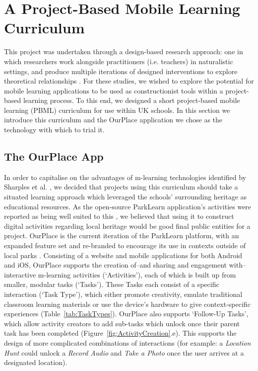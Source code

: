 \documentclass[,hyphens]{sigchi}
\begin{document}
\section{A Project-Based Mobile Learning Curriculum}
This project was undertaken through a design-based research approach: one in which researchers work alongside practitioners (i.e. teachers) in naturalistic settings, and produce multiple iterations of designed interventions to explore theoretical relationships \cite{Barab2004}. For these studies, we wished to explore the potential for mobile learning applications to be used as constructionist tools within a project-based learning process. To this end, we designed a short project-based mobile learning (PBML) curriculum for use within UK schools. In this section we introduce this curriculum and the OurPlace application we chose as the technology with which to trial it.

\subsection{The OurPlace App}
In order to capitalise on the advantages of m-learning technologies identified by Sharples et al. \cite{Sharples2007}, we decided that projects using this curriculum should take a situated learning approach which leveraged the schools' surrounding heritage as educational resources. As the open-source ParkLearn application's activities were reported as being well suited to this \cite{Richardson2018}, we believed that using it to construct digital activities regarding local heritage would be good final public entities for a project. OurPlace is the current iteration of the ParkLearn platform, with an expanded feature set and re-branded to encourage its use in contexts outside of local parks \cite{Richardson2018a}. Consisting of a website and mobile applications for both Android and iOS, OurPlace supports the creation of--and sharing and engagement with--interactive m-learning activities (`Activities'), each of which is built up from smaller, modular tasks (`Tasks'). These Tasks each consist of a specific interaction (`Task Type'), which either promote creativity, emulate traditional classroom learning materials or use the device's hardware to give context-specific experiences (Table~\ref{tab:TaskTypes}). OurPlace also supports `Follow-Up Tasks', which allow activity creators to add sub-tasks which unlock once their parent task has been completed (Figure~\ref{fig:ActivityCreation}.e). This supports the design of more complicated combinations of interactions (for example: a \textit{Location Hunt} could unlock a \textit{Record Audio} and \textit{Take a Photo} once the user arrives at a designated location).
\end{document}
